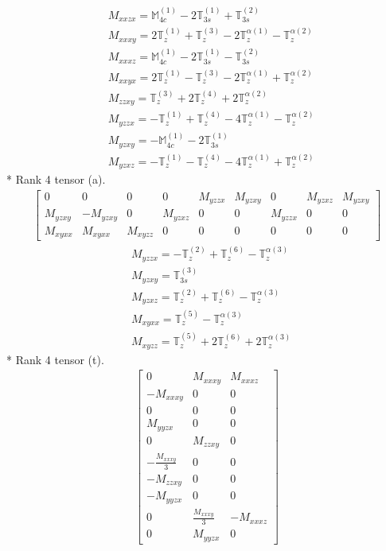 \documentclass[fleqn,8pt,landscape]{jsarticle}
\begin{document}
\begin{align*}
& M_{xxzx} = \mathbb{M}_{4c}^{(1)} - 2 \mathbb{T}_{3s}^{(1)} + \mathbb{T}_{3s}^{(2)} \\
& M_{xxxy} = 2 \mathbb{T}_{z}^{(1)} + \mathbb{T}_{z}^{(3)} - 2 \mathbb{T}_{z}^{\alpha(1)} - \mathbb{T}_{z}^{\alpha(2)} \\
& M_{xxxz} = \mathbb{M}_{4c}^{(1)} - 2 \mathbb{T}_{3s}^{(1)} - \mathbb{T}_{3s}^{(2)} \\
& M_{xxyx} = 2 \mathbb{T}_{z}^{(1)} - \mathbb{T}_{z}^{(3)} - 2 \mathbb{T}_{z}^{\alpha(1)} + \mathbb{T}_{z}^{\alpha(2)} \\
& M_{zzxy} = \mathbb{T}_{z}^{(3)} + 2 \mathbb{T}_{z}^{(4)} + 2 \mathbb{T}_{z}^{\alpha(2)} \\
& M_{yzzx} = - \mathbb{T}_{z}^{(1)} + \mathbb{T}_{z}^{(4)} - 4 \mathbb{T}_{z}^{\alpha(1)} - \mathbb{T}_{z}^{\alpha(2)} \\
& M_{yzxy} = - \mathbb{M}_{4c}^{(1)} - 2 \mathbb{T}_{3s}^{(1)} \\
& M_{yzxz} = - \mathbb{T}_{z}^{(1)} - \mathbb{T}_{z}^{(4)} - 4 \mathbb{T}_{z}^{\alpha(1)} + \mathbb{T}_{z}^{\alpha(2)}
\end{align*}
* Rank 4 tensor (a).
\begin{align*}
\begin{bmatrix} 0 & 0 & 0 & 0 & M_{yzzx} & M_{yzxy} & 0 & M_{yzxz} & M_{yzxy} \\ M_{yzxy} & - M_{yzxy} & 0 & M_{yzxz} & 0 & 0 & M_{yzzx} & 0 & 0 \\ M_{xyxx} & M_{xyxx} & M_{xyzz} & 0 & 0 & 0 & 0 & 0 & 0 \end{bmatrix}
\end{align*}
\begin{align*}
& M_{yzzx} = - \mathbb{T}_{z}^{(2)} + \mathbb{T}_{z}^{(6)} - \mathbb{T}_{z}^{\alpha(3)} \\
& M_{yzxy} = \mathbb{T}_{3s}^{(3)} \\
& M_{yzxz} = \mathbb{T}_{z}^{(2)} + \mathbb{T}_{z}^{(6)} - \mathbb{T}_{z}^{\alpha(3)} \\
& M_{xyxx} = \mathbb{T}_{z}^{(5)} - \mathbb{T}_{z}^{\alpha(3)} \\
& M_{xyzz} = \mathbb{T}_{z}^{(5)} + 2 \mathbb{T}_{z}^{(6)} + 2 \mathbb{T}_{z}^{\alpha(3)}
\end{align*}
* Rank 4 tensor (t).
\begin{align*}
\begin{bmatrix} 0 & M_{xxxy} & M_{xxxz} \\ - M_{xxxy} & 0 & 0 \\ 0 & 0 & 0 \\ M_{yyzx} & 0 & 0 \\ 0 & M_{zzxy} & 0 \\ - \frac{M_{xxxy}}{3} & 0 & 0 \\ - M_{zzxy} & 0 & 0 \\ - M_{yyzx} & 0 & 0 \\ 0 & \frac{M_{xxxy}}{3} & - M_{xxxz} \\ 0 & M_{yyzx} & 0 \end{bmatrix}
\end{align*}
\end{document}
